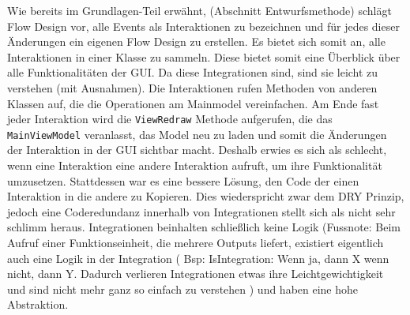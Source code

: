 Wie bereits im Grundlagen-Teil erwähnt, (Abschnitt Entwurfsmethode) schlägt Flow Design
vor, alle Events als Interaktionen zu bezeichnen und für jedes dieser
Änderungen ein eigenen Flow Design zu erstellen. 
Es bietet sich somit an, alle Interaktionen in einer Klasse zu sammeln.
Diese bietet somit eine Überblick über alle Funktionalitäten der GUI.
Da diese Integrationen sind, sind sie leicht zu verstehen (mit Ausnahmen). Die
Interaktionen rufen Methoden von anderen Klassen auf, die die Operationen am
Mainmodel vereinfachen. Am Ende fast jeder Interaktion wird die \texttt{ViewRedraw}
Methode aufgerufen, die das \texttt{MainViewModel} veranlasst, das Model neu zu
laden und somit die Änderungen der Interaktion in der GUI sichtbar macht.
Deshalb erwies es sich als schlecht, wenn eine Interaktion eine andere
Interaktion aufruft, um ihre Funktionalität umzusetzen. 
Stattdessen war es eine bessere Lösung, den Code der einen Interaktion in
die andere zu Kopieren. Dies wiederspricht zwar dem DRY Prinzip, jedoch eine
Coderedundanz innerhalb von Integrationen stellt sich als nicht sehr schlimm
heraus. Integrationen beinhalten schließlich keine Logik (Fussnote: Beim
Aufruf einer Funktionseinheit, die mehrere Outputs liefert, existiert
eigentlich auch eine Logik in der Integration ( Bsp: IsIntegration: Wenn ja,
dann X wenn nicht, dann Y. Dadurch verlieren Integrationen etwas ihre
Leichtgewichtigkeit und sind nicht mehr ganz so einfach zu verstehen ) und haben eine hohe
Abstraktion.

